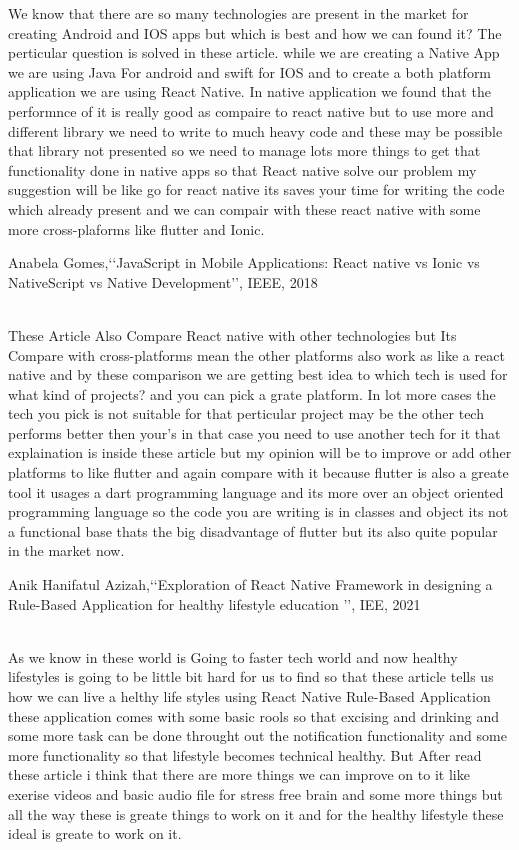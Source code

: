 \documentclass[12pt,a4paper]{report}
\begin{document}
\begin{enumerate}
 We know that there are so many technologies are present in the market for creating Android and IOS apps but which is best and how we can found it? The perticular question is solved in these article. while we are creating a Native App we are using Java For android and swift for IOS and to create a both platform application we are using React Native. In native application we found that the performnce of it is really good as compaire to react native but to use more and different library  we need to write to much heavy code and these may be possible that library not presented so we need to manage lots more things to get that functionality done in native apps so that React native solve our problem my suggestion will be like go for react native its saves your time for writing the code which already present and we can compair with these react native with some more cross-plaforms like flutter  and Ionic. 

\newpage

{\bf\item Anabela Gomes,\lq\lq JavaScript in Mobile Applications: React native vs Ionic vs NativeScript vs Native Development\rq\rq, IEEE, 2018}
\\

 These Article Also Compare React native with other technologies but Its Compare with cross-platforms mean the other platforms also work as like a react native and by these comparison we are getting best idea to which tech is used for what kind of projects? and you can pick a grate platform. In lot more cases the tech you pick is not suitable for that perticular project may be the other tech performs better then your's in that case you need to use another tech for it that explaination is inside these article but my opinion will be to improve or add other platforms to like flutter and again compare with it because flutter is also a greate tool it usages a dart programming language and its more over an object oriented programming language  so the code you are writing is in classes and object its not a functional base thats the big disadvantage of flutter but its also quite popular in the market now.


{\bf\item Anik Hanifatul Azizah,\lq\lq Exploration of React Native Framework in designing a Rule-Based Application for healthy lifestyle education \rq\rq, IEE, 2021}
\\
As  we know in these world is Going to faster tech world and now healthy lifestyles is going to be little bit hard for us to find so that these article tells us how we can live a helthy life styles using React Native Rule-Based Application these application comes with some basic rools so that excising and drinking and some more task can be done throught out the notification functionality and some more functionality so that lifestyle becomes technical healthy. But After read these article i think that there are more things we can improve on to it like exerise videos and basic audio file for stress free brain and some more things but all the way these is greate things to work on it and for the healthy lifestyle these ideal is greate to work on it.



\end{enumerate}
\end{document}
